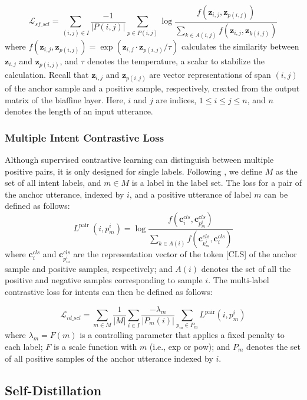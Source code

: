 \documentclass{ecai}
\begin{document}
\begin{equation}
\nonumber
    \mathcal{L}_{sf\_scl}=\sum_{(i,j) \in I} \frac{-1}{|P(i,j)|} \sum_{p \in P(i,j)} \log \frac{f\left(\textbf{z}_{i,j}, \textbf{z}_{p(i,j)}\right)}{\sum_{k \in A(i,j)} f\left(\textbf{z}_{i,j}, \textbf{z}_{k(i,j)}\right)}
\end{equation}
where $f\left(\textbf{z}_{i,j}, \textbf{z}_{p(i,j)}\right) = \exp(\textbf{z}_{i,j} \cdot \textbf{z}_{p(i,j)} /\tau)$ calculates the similarity between $\textbf{z}_{i,j}$ and $\textbf{z}_{p(i,j)}$, and $\tau$ denotes the temperature, a scalar to stabilize the calculation. Recall that $\textbf{z}_{i,j}$ and $\textbf{z}_{p(i,j)}$ are vector representations of span $(i,j)$ of the anchor sample and a positive sample, respectively, created from the output matrix of the biaffine layer. Here, $i$ and $j$ are indices, $1 \leq i \leq j \leq n$, and $n$ denotes the length of an input utterance. 

\subsubsection{Multiple Intent Contrastive Loss}
Although supervised contrastive learning can distinguish between multiple positive pairs, it is only designed for single labels. Following \cite{zhang:2022}, we define $M$ as the set of all intent labels, and $m \in M$ is a label in the label set. The loss for a pair of the anchor utterance, indexed by $i$, and a positive utterance of label $m$ can be defined as follows:
$$
L^{\text {pair }}\left(i, p_m^i\right)=\log \frac{f\left(\textbf{c}_i^{cls}, \textbf{c}_{p_m^i}^{cls}\right)}{\sum_{k \in A(i)} f\left(\textbf{c}_{k_m^i}^{cls}, \textbf{c}_i^{cls}\right)}
$$
where $\textbf{c}_i^{cls}$ and $\textbf{c}_{p_m^i}^{cls}$ are the representation vector of the token [CLS] of the anchor sample and positive samples, respectively; and $A(i)$ denotes the set of all the positive and negative samples corresponding to sample $i$. The multi-label contrastive loss for intents can then be defined as follows:

$$\mathcal{L}_{id\_scl}=\sum_{m \in M} \frac{1}{|M|} \sum_{i \in I} \frac{-\lambda_m}{\left|P_m(i)\right|} \sum_{p_m \in P_m} L^{\mathrm{pair}}\left(i, p_m^i\right)$$
where $\lambda_m = F(m)$ is a controlling parameter that applies a fixed penalty to each label; $F$ is a scale function with $m$ (i.e., exp or pow); and $P_m$ denotes the set of all positive samples of the anchor utterance indexed by $i$. 
\subsection{Self-Distillation}
\end{document}

